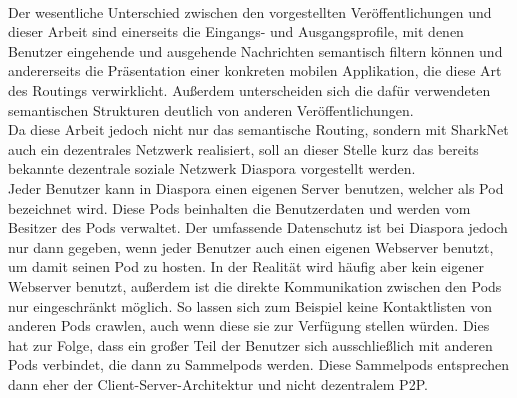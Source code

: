 \\Der wesentliche Unterschied zwischen den vorgestellten Veröffentlichungen und dieser Arbeit sind einerseits die Eingangs- und Ausgangsprofile, mit denen Benutzer eingehende und ausgehende Nachrichten semantisch filtern können und andererseits die Präsentation einer konkreten mobilen Applikation, die diese Art des Routings verwirklicht. Außerdem unterscheiden sich die dafür verwendeten semantischen Strukturen deutlich von anderen Veröffentlichungen. 
\\Da diese Arbeit jedoch nicht nur das semantische Routing, sondern mit SharkNet auch ein dezentrales Netzwerk realisiert, soll an dieser Stelle kurz das bereits bekannte dezentrale soziale Netzwerk Diaspora vorgestellt werden.
\\ Jeder Benutzer kann in Diaspora einen eigenen Server benutzen, welcher als Pod bezeichnet wird. Diese Pods beinhalten die Benutzerdaten und werden vom Besitzer des Pods verwaltet. Der umfassende Datenschutz ist bei Diaspora jedoch nur dann gegeben, wenn jeder Benutzer auch einen eigenen Webserver benutzt, um damit seinen Pod zu hosten. In der Realität wird häufig aber kein eigener Webserver benutzt, außerdem ist die direkte Kommunikation zwischen den Pods nur eingeschränkt möglich. So lassen sich zum Beispiel keine Kontaktlisten von anderen Pods crawlen, auch wenn diese sie zur Verfügung stellen würden. Dies hat zur Folge, dass ein großer Teil der Benutzer sich ausschließlich mit anderen Pods verbindet, die dann zu Sammelpods werden. Diese Sammelpods entsprechen dann eher der Client-Server-Architektur und nicht dezentralem P2P.
\newpage

